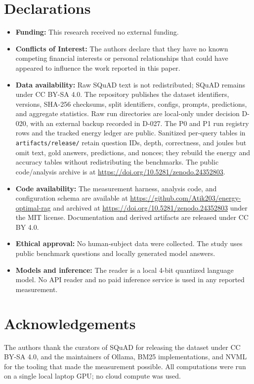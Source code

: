 \documentclass[a4paper,fleqn]{cas-sc}
\begin{document}
\section*{Declarations}
\begin{itemize}
  \setlength{\itemsep}{0pt}
  \setlength{\parsep}{0pt}
  \item \textbf{Funding:} This research received no external funding.

  \item \textbf{Conflicts of Interest:} The authors declare that they have no known competing financial interests or personal relationships that could have appeared to influence the work reported in this paper.

  \item \textbf{Data availability:} Raw SQuAD text is not redistributed; SQuAD remains under CC BY-SA 4.0. The repository publishes the dataset identifiers, versions, SHA-256 checksums, split identifiers, configs, prompts, predictions, and aggregate statistics. Raw run directories are local-only under decision D-020, with an external backup recorded in D-027. The P0 and P1 run registry rows and the tracked energy ledger are public. Sanitized per-query tables in \texttt{artifacts/release/} retain question IDs, depth, correctness, and joules but omit text, gold answers, predictions, and nonces; they rebuild the energy and accuracy tables without redistributing the benchmarks. The public code/analysis archive is at \url{https://doi.org/10.5281/zenodo.24352803}.

  \item \textbf{Code availability:} The measurement harness, analysis code, and configuration schema are available at \url{https://github.com/Atik203/energy-optimal-rag} and archived at \url{https://doi.org/10.5281/zenodo.24352803} under the MIT license. Documentation and derived artifacts are released under CC BY 4.0.

  \item \textbf{Ethical approval:} No human-subject data were collected. The study uses public benchmark questions and locally generated model answers.

  \item \textbf{Models and inference:} The reader is a local 4-bit quantized language model. No API reader and no paid inference service is used in any reported measurement.
\end{itemize}

\section*{Acknowledgements}
The authors thank the curators of SQuAD for releasing the dataset under CC BY-SA 4.0, and the maintainers of Ollama, BM25 implementations, and NVML for the tooling that made the measurement possible. All computations were run on a single local laptop GPU; no cloud compute was used.

\sloppy
\setlength{\bibsep}{0pt}
\renewcommand{\bibfont}{\fontsize{7.8pt}{8.3pt}\selectfont}



\vspace{4pt}
\end{document}
